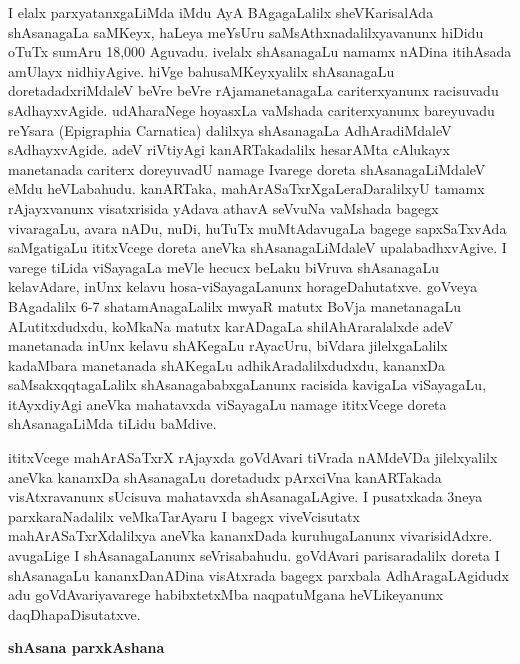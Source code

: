 \documentclass[11pt,a4size]{article}
\begin{document}

\newpage

I elalx parxyatanxgaLiMda iMdu AyA BAgagaLalilx sheVKarisalAda
shAsanagaLa saMKeyx, haLeya meYsUru saMsAthxnadalilxyavanunx hiDidu
oTuTx sumAru 18,000 Aguvadu. ivelalx shAsanagaLu namamx nADina
itihAsada amUlayx nidhiyAgive. hiVge bahusaMKeyxyalilx shAsanagaLu
doretadadxriMdaleV beVre beVre rAjamanetanagaLa cariterxyanunx
racisuvadu sAdhayxvAgide. udAharaNege hoyasxLa vaMshada cariterxyanunx
bareyuvadu reYsara {\rm (Epigraphia Carnatica)}
dalilxya shAsanagaLa AdhAradiMdaleV sAdhayxvAgide. adeV riVtiyAgi
kanARTakadalilx hesarAMta cAlukayx manetanada cariterx doreyuvadU
namage Ivarege doreta shAsanagaLiMdaleV eMdu heVLabahudu. kanARTaka,
mahArASaTxrXgaLeraDaralilxyU tamamx rAjayxvanunx visatxrisida yAdava
athavA seVvuNa vaMshada bagegx vivaragaLu, avara nADu, nuDi, huTuTx
muMtAdavugaLa bagege sapxSaTxvAda saMgatigaLu ititxVcege doreta aneVka
shAsanagaLiMdaleV upalabadhxvAgive. I varege tiLida viSayagaLa meVle
hecucx beLaku biVruva shAsanagaLu kelavAdare, inUnx kelavu
hosa-viSayagaLanunx horageDahutatxve. goVveya BAgadalilx 6-7
shatamAnagaLalilx mwyaR matutx BoVja manetanagaLu ALutitxdudxdu,
koMkaNa matutx karADagaLa shilAhAraralalxde adeV manetanada inUnx
kelavu shAKegaLu rAyacUru, biVdara jilelxgaLalilx kadaMbara manetanada
shAKegaLu adhikAradalilxdudxdu, kananxDa saMsakxqqtagaLalilx
shAsanagababxgaLanunx racisida kavigaLa viSayagaLu, itAyxdiyAgi aneVka
mahatavxda viSayagaLu namage ititxVcege doreta shAsanagaLiMda tiLidu
baMdive.

ititxVcege mahArASaTxrX rAjayxda goVdAvari tiVrada nAMdeVDa
jilelxyalilx aneVka kananxDa shAsanagaLu doretadudx pArxciVna
kanARTakada visAtxravanunx sUcisuva mahatavxda shAsanagaLAgive. I
pusatxkada 3neya parxkaraNadalilx veMkaTarAyaru I bagegx viveVcisutatx
mahArASaTxrXdalilxya aneVka kananxDada kuruhugaLanunx
vivarisidAdxre. avugaLige I shAsanagaLanunx seVrisabahudu. goVdAvari
parisaradalilx doreta I shAsanagaLu kananxDanADina visAtxrada bagegx
parxbala AdhAragaLAgidudx adu goVdAvariyavarege habibxtetxMba
naqpatuMgana heVLikeyanunx daqDhapaDisutatxve.

\medskip
\noindent
\textbf{\Large shAsana parxkAshana}
\smallskip
\end{document}
